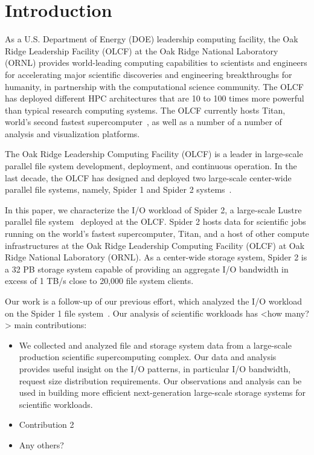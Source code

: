 \section{Introduction}
\label{sec:intro}

As a U.S. Department of Energy (DOE) leadership computing facility, the Oak
Ridge Leadership Facility (OLCF) at the Oak Ridge National Laboratory (ORNL)
provides world-leading computing capabilities to scientists and engineers for
accelerating major scientific discoveries and engineering breakthroughs for
humanity, in partnership with the computational science community. The OLCF has
deployed different HPC architectures that are 10 to 100 times more powerful
than typical research computing systems. The OLCF currently hosts Titan,
world's second fastest supercomputer~\cite{titan}, as well as a number of a
number of analysis and visualization platforms.


The Oak Ridge Leadership Computing Facility (OLCF) is a leader in large-scale
parallel file system development, deployment, and continuous operation. In the
last decade, the OLCF has designed and deployed two large-scale center-wide
parallel file systems, namely, Spider 1 and Spider 2 systems~\cite{spider1,
spider2}. 

In this paper, we characterize the I/O workload of Spider 2, a large-scale
Lustre parallel file system~\cite{spider2} deployed at the OLCF. Spider 2 hosts
data for scientific jobs running on the world's fastest supercomputer, Titan,
and a host of other compute infrastructures at the Oak Ridge Leadership
Computing Facility (OLCF) at Oak Ridge National Laboratory (ORNL). As a
center-wide storage system, Spider 2 is a 32 PB storage system capable of
providing an aggregate I/O bandwidth in excess of 1 TB/s close to 20,000
file system clients. 

Our work is a follow-up of our previous effort, which analyzed the I/O workload
on the Spider 1 file system~\cite{spider1-workload}.  Our analysis of
scientific workloads has <how many?> main contributions: 

\begin{itemize}


\item We collected and analyzed file and storage system data from a large-scale
production scientific supercomputing complex. Our data and analysis provides
useful insight on the I/O patterns, in particular I/O bandwidth, request size
distribution requirements. Our observations and analysis can be used in
building more efficient next-generation large-scale storage systems for
scientific workloads.  

\item Contribution 2

\item Any others? 

\end{itemize}
